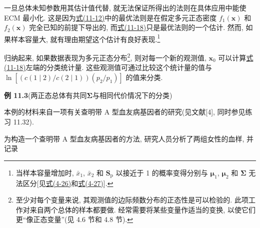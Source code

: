 一旦总体未知参数用其估计值代替, 就无法保证所得出的法则在具体应用中能使 ECM 最小化. 这是因为\hyperref[eq:11-12]{式(11-12)}中的最优法则是在假定多元正态密度 $f_1(\mathbf{x})$ 和 $f_2(\mathbf{x})$ 完全已知的前提下导出的, 而\hyperref[eq:11-18]{式(11-18)}只是最优法则的一个估计. 然而, 如果样本容量大, 就有理由期望这个估计有良好表现.\footnote{当样本容量增加时, $\bar{x}_1$, $\bar{x}_2$ 和 $\mathbf{S}_{\mathrm{p}}$ 以接近于 1 的概率变得分别与 $\boldsymbol{\mu}_1$, $\boldsymbol{\mu}_2$ 和 $\boldsymbol{\Sigma}$ 无法区分[见\hyperref[eq:4-26]{式(4-26)}和\hyperref[eq:4-27]{式(4-27)}].}

归纳起来, 如果数据表现为多元正态分布\footnote{至少对每个变量来说, 其观测值的边际频数分布的正态性是可以检验的. 此项工作对来自两个总体的样本都要做. 经常需要将某些变量作适当的变换, 以使它们更“像正态变量”(见 4.6 节和 4.8 节).}, 则对每一个新的观测值, $\mathbf{x}_0$ 可以计算\hyperref[eq:11-18]{式(11-18)}左端的分类统计量. 这些观测值可通过比较这个统计量的值与 $\ln[(c(1\mid2)/c(2\mid1))(p_2/p_1)]$ 的值来分类.

\noindent\textbf{例 11.3}\quad (两正态总体有共同$\boldsymbol{\Sigma}$与相同代价情况下的分类)

本例的材料来自一项有关查明带 A 型血友病基因者的研究(见文献[4], 同时参见练习 11.32).

为构造一个查明带 A 型血友病基因者的方法, 研究人员分析了两组女性的血样, 并记录
